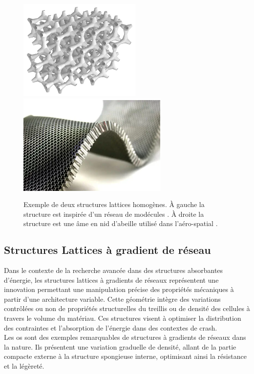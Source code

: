 \documentclass[a4paper]{article}
\begin{document}
	\begin{figure}[H]
		\centering
		\includegraphics[height=5cm]{Images/2/lattice.jpg}
		\includegraphics[height=5cm]{Images/2/nidabeille.png}
		\caption{Exemple de deux structures lattices homogènes. À gauche la structure est inspirée d'un réseau de modécules \cite{lat_hom1}. À droite la structure est une âme en nid d'abeille utilisé dans l'aéro-spatial \cite{lat_hom2}.}
	\end{figure}
	\newpage
	
	\subsection{Structures Lattices à gradient de réseau}
	
	\hspace{0.5cm}Dans le contexte de la recherche avancée dans des structures absorbantes d'énergie, les structures lattices à gradients de réseaux représentent une innovation permettant une manipulation précise des propriétés mécaniques à partir d’une architecture variable. Cette géométrie intègre des variations contrôlées ou non de propriétés structurelles du treillis ou de densité des cellules à travers le volume du matériau. Ces structures visent à optimiser la distribution des contraintes et l’absorption de l'énergie dans des contextes de crash.\\
	
	Les os sont des exemples remarquables de structures à gradients de réseaux dans la nature. Ils présentent une variation graduelle de densité, allant de la partie compacte externe à la structure spongieuse interne, optimisant ainsi la résistance et la légèreté.\\
	
\end{document}
